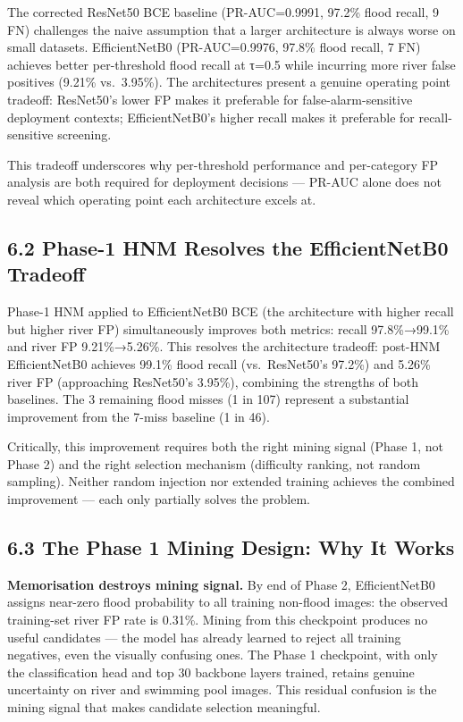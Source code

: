 \documentclass[
  11pt,
]{article}
\begin{document}
The corrected ResNet50 BCE baseline (PR-AUC=0.9991, 97.2\% flood recall,
9 FN) challenges the naive assumption that a larger architecture is
always worse on small datasets. EfficientNetB0 (PR-AUC=0.9976, 97.8\%
flood recall, 7 FN) achieves better per-threshold flood recall at τ=0.5
while incurring more river false positives (9.21\% vs.~3.95\%). The
architectures present a genuine operating point tradeoff: ResNet50's
lower FP makes it preferable for false-alarm-sensitive deployment
contexts; EfficientNetB0's higher recall makes it preferable for
recall-sensitive screening.

This tradeoff underscores why per-threshold performance and per-category
FP analysis are both required for deployment decisions --- PR-AUC alone
does not reveal which operating point each architecture excels at.

\subsection{6.2 Phase-1 HNM Resolves the EfficientNetB0
Tradeoff}\label{phase-1-hnm-resolves-the-efficientnetb0-tradeoff}

Phase-1 HNM applied to EfficientNetB0 BCE (the architecture with higher
recall but higher river FP) simultaneously improves both metrics: recall
97.8\%→99.1\% and river FP 9.21\%→5.26\%. This resolves the architecture
tradeoff: post-HNM EfficientNetB0 achieves 99.1\% flood recall
(vs.~ResNet50's 97.2\%) and 5.26\% river FP (approaching ResNet50's
3.95\%), combining the strengths of both baselines. The 3 remaining
flood misses (1 in 107) represent a substantial improvement from the
7-miss baseline (1 in 46).

Critically, this improvement requires both the right mining signal
(Phase 1, not Phase 2) and the right selection mechanism (difficulty
ranking, not random sampling). Neither random injection nor extended
training achieves the combined improvement --- each only partially
solves the problem.

\subsection{6.3 The Phase 1 Mining Design: Why It
Works}\label{the-phase-1-mining-design-why-it-works}

\textbf{Memorisation destroys mining signal.} By end of Phase 2,
EfficientNetB0 assigns near-zero flood probability to all training
non-flood images: the observed training-set river FP rate is 0.31\%.
Mining from this checkpoint produces no useful candidates --- the model
has already learned to reject all training negatives, even the visually
confusing ones. The Phase 1 checkpoint, with only the classification
head and top 30 backbone layers trained, retains genuine uncertainty on
river and swimming pool images. This residual confusion is the mining
signal that makes candidate selection meaningful.
\end{document}

